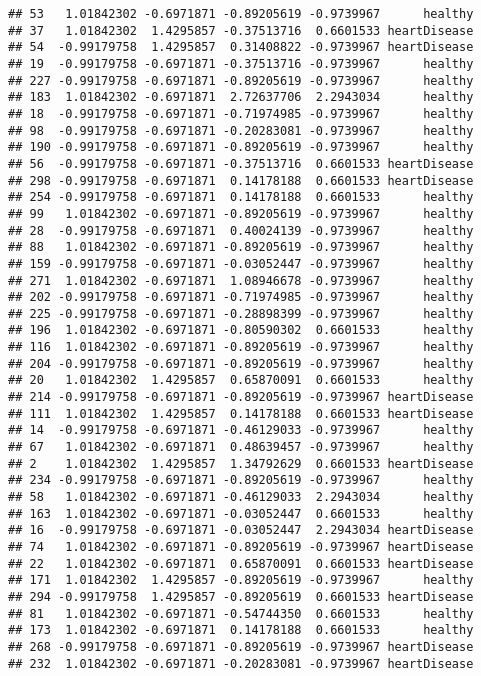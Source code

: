 \documentclass[
]{article}
\begin{document}
\begin{verbatim}
## 53   1.01842302 -0.6971871 -0.89205619 -0.9739967      healthy
## 37   1.01842302  1.4295857 -0.37513716  0.6601533 heartDisease
## 54  -0.99179758  1.4295857  0.31408822 -0.9739967 heartDisease
## 19  -0.99179758 -0.6971871 -0.37513716 -0.9739967      healthy
## 227 -0.99179758 -0.6971871 -0.89205619 -0.9739967      healthy
## 183  1.01842302 -0.6971871  2.72637706  2.2943034      healthy
## 18  -0.99179758 -0.6971871 -0.71974985 -0.9739967      healthy
## 98  -0.99179758 -0.6971871 -0.20283081 -0.9739967      healthy
## 190 -0.99179758 -0.6971871 -0.89205619 -0.9739967      healthy
## 56  -0.99179758 -0.6971871 -0.37513716  0.6601533 heartDisease
## 298 -0.99179758 -0.6971871  0.14178188  0.6601533 heartDisease
## 254 -0.99179758 -0.6971871  0.14178188  0.6601533      healthy
## 99   1.01842302 -0.6971871 -0.89205619 -0.9739967      healthy
## 28  -0.99179758 -0.6971871  0.40024139 -0.9739967      healthy
## 88   1.01842302 -0.6971871 -0.89205619 -0.9739967      healthy
## 159 -0.99179758 -0.6971871 -0.03052447 -0.9739967      healthy
## 271  1.01842302 -0.6971871  1.08946678 -0.9739967      healthy
## 202 -0.99179758 -0.6971871 -0.71974985 -0.9739967      healthy
## 225 -0.99179758 -0.6971871 -0.28898399 -0.9739967      healthy
## 196  1.01842302 -0.6971871 -0.80590302  0.6601533      healthy
## 116  1.01842302 -0.6971871 -0.89205619 -0.9739967      healthy
## 204 -0.99179758 -0.6971871 -0.89205619 -0.9739967      healthy
## 20   1.01842302  1.4295857  0.65870091  0.6601533      healthy
## 214 -0.99179758 -0.6971871 -0.89205619 -0.9739967 heartDisease
## 111  1.01842302  1.4295857  0.14178188  0.6601533 heartDisease
## 14  -0.99179758 -0.6971871 -0.46129033 -0.9739967      healthy
## 67   1.01842302 -0.6971871  0.48639457 -0.9739967      healthy
## 2    1.01842302  1.4295857  1.34792629  0.6601533 heartDisease
## 234 -0.99179758 -0.6971871 -0.89205619 -0.9739967      healthy
## 58   1.01842302 -0.6971871 -0.46129033  2.2943034      healthy
## 163  1.01842302 -0.6971871 -0.03052447  0.6601533      healthy
## 16  -0.99179758 -0.6971871 -0.03052447  2.2943034 heartDisease
## 74   1.01842302 -0.6971871 -0.89205619 -0.9739967 heartDisease
## 22   1.01842302 -0.6971871  0.65870091  0.6601533 heartDisease
## 171  1.01842302  1.4295857 -0.89205619 -0.9739967      healthy
## 294 -0.99179758  1.4295857 -0.89205619  0.6601533 heartDisease
## 81   1.01842302 -0.6971871 -0.54744350  0.6601533      healthy
## 173  1.01842302 -0.6971871  0.14178188  0.6601533      healthy
## 268 -0.99179758 -0.6971871 -0.89205619 -0.9739967 heartDisease
## 232  1.01842302 -0.6971871 -0.20283081 -0.9739967 heartDisease

\end{verbatim}
\end{document}
